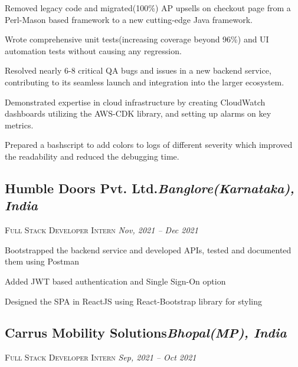 \documentclass[10pt]{article}
\begin{document}
\begin{description}
\setlength{\itemindent}{2\parindent}
\setlength{\itemsep}{0em}
\item[$\bullet$]{Removed legacy code and migrated(100\%) AP upsells on checkout page from a Perl-Mason based framework to a new cutting-edge Java framework.
\item[$\bullet$] Wrote comprehensive unit tests(increasing coverage beyond 96\%) and UI automation tests without causing any regression.}
\item[$\bullet$]{Resolved nearly 6-8 critical QA bugs and issues in a new backend service, contributing to its seamless launch and integration into the larger ecosystem.}
\item[$\bullet$]{Demonstrated expertise in cloud infrastructure by creating CloudWatch dashboards utilizing the AWS-CDK library, and setting up alarms on key metrics.}
\item[$\bullet$] Prepared a bashscript to add colors to logs of different severity which improved the readability and reduced the debugging time.
\end{description}

\subsection*{Humble Doors Pvt. Ltd.\hfill \normalsize \normalfont \textit{Banglore(Karnataka), India}}
\vspace{-1ex}
\textsc{\textmd{Full Stack Developer Intern}} \hfill \normalsize \textit{Nov, 2021 -- Dec 2021}
\vspace{-1ex}

\begin{description}
\setlength{\itemindent}{2\parindent}
\setlength{\itemsep}{0em}
\item[$\bullet$]{Bootstrapped the backend service and developed APIs, tested and documented them using Postman}
\item[$\bullet$]{Added JWT based authentication and Single Sign-On option}
\item[$\bullet$]{Designed the SPA in ReactJS using React-Bootstrap library for styling}
\end{description}

\subsection*{Carrus Mobility Solutions\hfill \normalsize \normalfont \textit{Bhopal(MP), India}}
\vspace{-1ex}
\textsc{\textmd{Full Stack Developer Intern}} \hfill \normalsize \textit{Sep, 2021 -- Oct 2021}
\vspace{-1ex}
\end{document}
